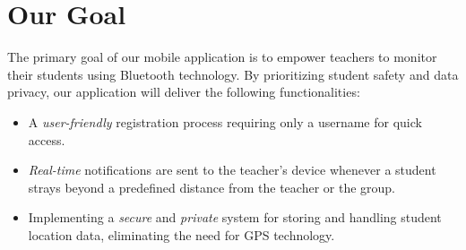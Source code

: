 \section{Our Goal}
The primary goal of our mobile application is to empower teachers to monitor their students using Bluetooth technology. By prioritizing student safety and data privacy, our application will deliver the following functionalities:
\begin{itemize}
\item A \emph{user-friendly} registration process requiring only a username for quick access.
\item \emph{Real-time} notifications are sent to the teacher's device whenever a student strays beyond a predefined distance from the teacher or the group.
\item Implementing a \emph{secure} and \emph{private} system for storing and handling student location data, eliminating the need for GPS technology.
\end{itemize}